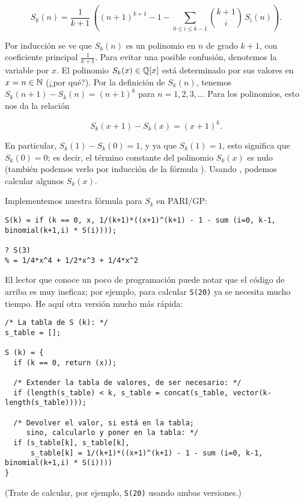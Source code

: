 \documentclass{article}
\numberwithin{equation}{section}
\theoremstyle{definition}
\begin{document}
\begin{equation}
  \label{formula-para-Skn}
  S_k (n) = \frac{1}{k+1} \, \left((n+1)^{k+1} - 1 - \sum_{0 \le i \le k-1} {k+1\choose i} \, S_i (n)\right).
\end{equation}

Por inducción se ve que $S_k (n)$ es un polinomio en $n$ de grado $k+1$,
con coeficiente principal $\frac{1}{k+1}$. Para evitar una posible confusión,
denotemos la variable por $x$. El polinomio $S_k (x) \in \mathbb{Q} [x]$ está
determinado por sus valores en $x = n \in \mathbb{N}$ (¿por qué?). Por la definición
de $S_k (n)$, tenemos $S_k (n+1) - S_k (n) = (n+1)^k$ para $n = 1,2,3,\ldots$
Para los polinomios, esto nos da la relación

\begin{equation}
  \label{eqn:Skn+1-y-Skn}
  S_k (x+1) - S_k (x) = (x+1)^k.
\end{equation}

En particular, $S_k (1) - S_k (0) = 1$, y ya que $S_k (1) = 1$, esto significa
que $S_k (0) = 0$; es decir, el término constante del polinomio $S_k (x)$ es
nulo (también podemos verlo por inducción de la fórmula
). Usando , podemos calcular
algunos $S_k (x)$.

\begin{shaded}
  \small

  \noindent Implementemos nuestra fórmula para $S_k$ en PARI/GP:

\begin{verbatim}
S(k) = if (k == 0, x, 1/(k+1)*((x+1)^(k+1) - 1 - sum (i=0, k-1, binomial(k+1,i) * S(i))));

? S(3)
% = 1/4*x^4 + 1/2*x^3 + 1/4*x^2
\end{verbatim}

  \noindent El lector que conoce un poco de programación puede notar que
  el código de arriba es muy ineficaz; por ejemplo, para calcular \verb|S(20)|
  ya se necesita mucho tiempo. He aquí otra versión mucho más rápida:

\begin{verbatim}
/* La tabla de S (k): */
s_table = [];

S (k) = {
  if (k == 0, return (x));

  /* Extender la tabla de valores, de ser necesario: */
  if (length(s_table) < k, s_table = concat(s_table, vector(k-length(s_table))));

  /* Devolver el valor, si está en la tabla;
     sino, calcularlo y poner en la tabla: */	
  if (s_table[k], s_table[k],
      s_table[k] = 1/(k+1)*((x+1)^(k+1) - 1 - sum (i=0, k-1, binomial(k+1,i) * S(i))))
}
\end{verbatim}

  \noindent (Trate de calcular, por ejemplo, \verb|S(20)| usando ambas
  versiones.)
\end{shaded}
\end{document}
